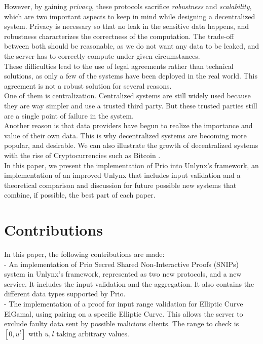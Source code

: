 \documentclass{article}
\begin{document}
However, by gaining \textit{privacy}, these protocols sacrifice \textit{robustness} and \textit{scalability}, which are two important aspects to keep in mind while designing a decentralized system. Privacy is necessary so that no leak in the sensitive data happens, and robustness characterizes the correctness of the computation. The trade-off between both should be reasonable, as we do not want any data to be leaked, and the server has to correctly compute under given circumstances.\\
These difficulties lead to the use of legal agreements rather than technical solutions, as only a few of the systems have been deployed in the real world. This agreement is not a robust solution for several reasons.\\
One of them is centralization. Centralized systems are still widely used \cite{dyadic, centralized} because they are way simpler and use a trusted third party. But these trusted parties still are a single point of failure in the system.\\
Another reason is that data providers have begun to realize the importance and value of their own data.
This is why decentralized systems are becoming more popular, and desirable. We can also illustrate the growth of decentralized systems with the rise of Cryptocurrencies such as Bitcoin \cite{bitcoin}.\\
In this paper, we present the implementation of Prio into Unlynx's framework, an implementation of an improved Unlynx that includes input validation and a theoretical comparison and discussion for future possible new systems that combine, if possible, the best part of each paper.
	
\section*{Contributions}
In this paper, the following contributions are made:\\
- An implementation of Prio Secred Shared Non-Interactive Proofs (SNIPs) system in Unlynx's framework, represented as two new protocols, and a new service. It includes the input validation and the aggregation. It also contains the different data types supported by Prio.\\

- The implementation of a proof for input range validation for Elliptic Curve ElGamal, using pairing on a specific Elliptic Curve. This allows the server to exclude faulty data sent by possible malicious clients. The range to check is $[0,u^l]$ with $u,l$ taking arbitrary values.\\
\end{document}
